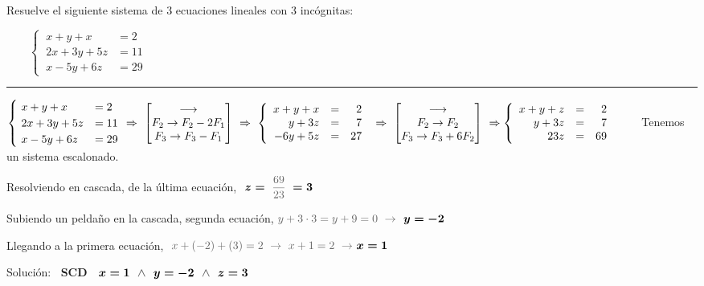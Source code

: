 \begin{miejemplo}

Resuelve el siguiente sistema de 3 ecuaciones lineales con 3 incógnitas:

\vspace{2mm} $\qquad \begin{cases}
\ x+y+x&=2 \\
\ 2x+3y+5z&=11 \\
\ x-5y+6z&=29	
\end{cases}$	

\vspace{2mm}
\rule{250pt}{0.1pt}

\vspace{4mm}

$\begin{cases}
\ x+y+x&=2 \\
\ 2x+3y+5z&=11 \\
\ x-5y+6z&=29	
\end{cases}\  \Rightarrow \ \mqty[\longrightarrow \\ F_2 \to F_2-2F_1\\ F_3\to
F_3-F_1] \ \Rightarrow \ \left\{
\begin{array}{rcr}
     x+y+x & = & 2 
  \\ y+3z & = & 7
  \\ -6y+5z & = & 27
\end{array}
\right. \ \Rightarrow \ \mqty[ \longrightarrow \\ F_2 \to F_2 \\ F_3\to F_3+6F_2 ] \ \Rightarrow \left\{
\begin{array}{rcr}
     x+y+z & = & 2 
  \\ y+3z & = & 7
  \\ 23z & = & 69
\end{array}
\right. \qquad$ Tenemos un sistema escalonado.

\vspace{2mm} Resolviendo en cascada, de la última ecuación, $\ \boldsymbol{z=}\  \textcolor{gris}{\dfrac{69}{23}}\ \boldsymbol{=3}$

\vspace{2mm} Subiendo un peldaño en la cascada, segunda ecuación, $\textcolor{gris}{y+3\cdot 3=y+9=0 \ \to \  } \ \boldsymbol{y=-2}$

\vspace{2mm} Llegando a la primera ecuación, $\ \textcolor{gris}{x+(-2)+(3)=2 \ \to \ x+1=2 \ \to } \ \boldsymbol{x=1}$

\vspace{2mm} Solución: $\ $ \textbf{SCD} $\ \ \boldsymbol{ x=1 \ \ \textcolor{gris}{\wedge} \ \ y=-2 \  \ \textcolor{gris}{\wedge} \ \ z=3 }$
\end{miejemplo}


